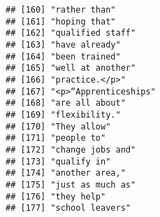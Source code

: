\documentclass[]{article}
\begin{document}
\begin{verbatim}
## [160] "rather than"                                                                                                                              
## [161] "hoping that"                                                                                                                              
## [162] "qualified staff"                                                                                                                          
## [163] "have already"                                                                                                                             
## [164] "been trained"                                                                                                                             
## [165] "well at another"                                                                                                                          
## [166] "practice.</p>"                                                                                                                            
## [167] "<p>“Apprenticeships"                                                                                                                      
## [168] "are all about"                                                                                                                            
## [169] "flexibility."                                                                                                                             
## [170] "They allow"                                                                                                                               
## [171] "people to"                                                                                                                                
## [172] "change jobs and"                                                                                                                          
## [173] "qualify in"                                                                                                                               
## [174] "another area,"                                                                                                                            
## [175] "just as much as"                                                                                                                          
## [176] "they help"                                                                                                                                
## [177] "school leavers"                                                                                                                           

\end{verbatim}
\end{document}
